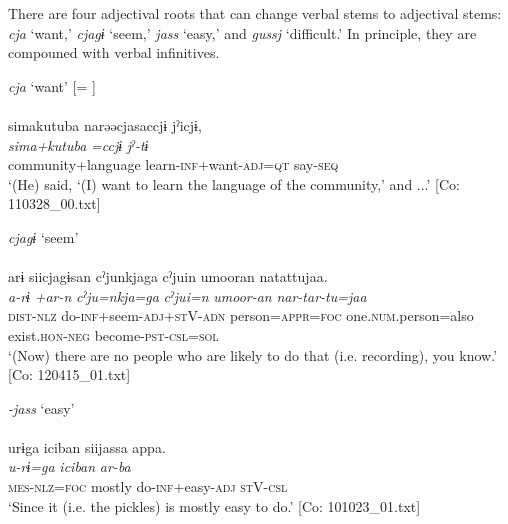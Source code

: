 There are four adjectival roots that can change verbal stems to adjectival stems: \textit{cja} ‘want,’ \textit{cjagɨ} ‘seem,’ \textit{jass} ‘easy,’ and \textit{gussj} ‘difficult.’ In principle, they are compouned with verbal infinitives.

\ea \label{ex:4.59} \ea  \textit{cja} ‘want’ [= ] \label{ex:4.59a}\\\\
  \glll    simakutuba   narəəcjasaccjɨ  jˀicjɨ,\\
      \textit{sima+kutuba}  \textit{=ccjɨ}  \textit{jˀ-tɨ}\\
      community+language  learn-\textsc{inf}+want-\textsc{adj}=\textsc{qt}  say-\textsc{seq}\\
      \glt       ‘(He) said, ‘(I) want to learn the language of the community,’ and ...’ [Co: 110328\_00.txt]

\ex  \textit{cjagɨ} ‘seem’\\\\
     \glll arɨ  siicjagɨsan  cˀjunkjaga    cˀjuin  umooran  natattujaa.\\
      \textit{a-rɨ}  \textit{+ar-n}  \textit{cˀju=nkja=ga}   \textit{cˀjui=n}  \textit{umoor-an}  \textit{nar-tar-tu=jaa}\\                                                                          
      \textsc{dist}-\textsc{nlz}  do-\textsc{inf}+seem-\textsc{adj}+\textsc{st}V-\textsc{adn}  person=\textsc{appr}=\textsc{foc}                   one.\textsc{num}.person=also  exist.\textsc{hon}-\textsc{neg}  become-\textsc{pst}-\textsc{csl}=\textsc{sol}\\
     \glt  ‘(Now) there are no people who are likely to do that (i.e. recording), you know.’   [Co: 120415\_01.txt]

\ex \textit{{}-jass} ‘easy’\\\\
    \glll     urɨga  {\textbar}iciban{\textbar}  siijassa  appa.\\
      \textit{u-rɨ=ga}  \textit{iciban}  \textit{}  \textit{ar-ba}\\
      \textsc{mes}-\textsc{nlz}=\textsc{foc}  mostly  do-\textsc{inf}+easy-\textsc{adj}  \textsc{st}V-\textsc{csl}\\
      \glt       ‘Since it (i.e. the pickles) is mostly easy to do.’ [Co: 101023\_01.txt]

